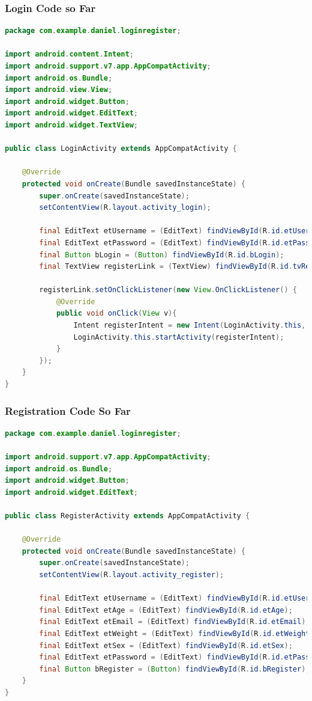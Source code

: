 \documentclass{article}
\begin{document}
\subsubsection{Login Code so Far}
\begin{lstlisting}[language = Java]
package com.example.daniel.loginregister;

import android.content.Intent;
import android.support.v7.app.AppCompatActivity;
import android.os.Bundle;
import android.view.View;
import android.widget.Button;
import android.widget.EditText;
import android.widget.TextView;

public class LoginActivity extends AppCompatActivity {

    @Override
    protected void onCreate(Bundle savedInstanceState) {
        super.onCreate(savedInstanceState);
        setContentView(R.layout.activity_login);

        final EditText etUsername = (EditText) findViewById(R.id.etUsername);
        final EditText etPassword = (EditText) findViewById(R.id.etPassword);
        final Button bLogin = (Button) findViewById(R.id.bLogin);
        final TextView registerLink = (TextView) findViewById(R.id.tvRegisterHere);

        registerLink.setOnClickListener(new View.OnClickListener() {
            @Override
            public void onClick(View v){
                Intent registerIntent = new Intent(LoginActivity.this, RegisterActivity.class);
                LoginActivity.this.startActivity(registerIntent);
            }
        });
    }
}
\end{lstlisting}

\subsubsection{Registration Code So Far}
\begin{lstlisting}[language = Java]
package com.example.daniel.loginregister;

import android.support.v7.app.AppCompatActivity;
import android.os.Bundle;
import android.widget.Button;
import android.widget.EditText;

public class RegisterActivity extends AppCompatActivity {

    @Override
    protected void onCreate(Bundle savedInstanceState) {
        super.onCreate(savedInstanceState);
        setContentView(R.layout.activity_register);

        final EditText etUsername = (EditText) findViewById(R.id.etUsername);
        final EditText etAge = (EditText) findViewById(R.id.etAge);
        final EditText etEmail = (EditText) findViewById(R.id.etEmail);
        final EditText etWeight = (EditText) findViewById(R.id.etWeight);
        final EditText etSex = (EditText) findViewById(R.id.etSex);
        final EditText etPassword = (EditText) findViewById(R.id.etPassword);
        final Button bRegister = (Button) findViewById(R.id.bRegister);
    }
}
\end{lstlisting}
\end{document}
